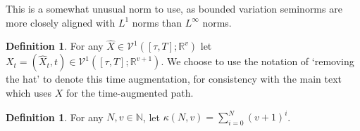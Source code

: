 \documentclass{article}
\theoremstyle{plain}
\theoremstyle{definition}
\newtheorem{definition}[thm]{Definition}
\newcommand{\reals}{\mathbb{R}}
\newcommand{\naturals}{\mathbb{N}}
\begin{document}
	This is a somewhat unusual norm to use, as bounded variation seminorms are more closely aligned with $L^1$ norms than $L^\infty$ norms.
	
	\begin{definition}
	For any $\widehat{X} \in \mathcal{V}^1([\tau, T]; \reals^v)$ let $X_t = (\widehat{X}_t, t) \in \mathcal{V}^1([\tau, T]; \reals^{v + 1})$. We choose to use the notation of `removing the hat' to denote this time augmentation, for consistency with the main text which uses $X$ for the time-augmented path.
	\end{definition}
	
	\begin{definition}
	For any $N, v \in \naturals$, let $\kappa(N, v) = \sum_{i = 0}^N (v + 1)^i$.
	\end{definition}
	
\end{document}
